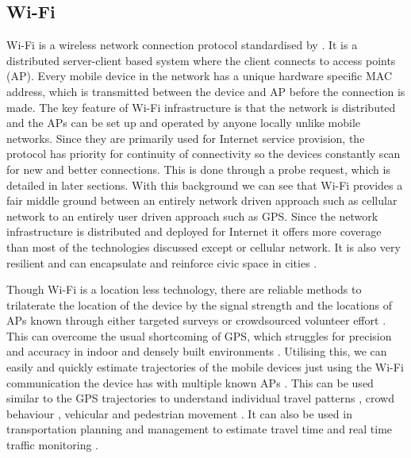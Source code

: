 \subsection{Wi-Fi}

Wi-Fi is a wireless network connection protocol standardised by \citet{ieee2016}.
It is a distributed server-client based system where the client connects to access points (AP).
Every mobile device in the network has a unique hardware specific MAC address, which is transmitted between the device and AP before the connection is made.
The key feature of Wi-Fi infrastructure is that the network is distributed and the APs can be set up and operated by anyone locally unlike mobile networks.
Since they are primarily used for Internet service provision, the protocol has priority for continuity of connectivity so the devices constantly scan for new and better connections.
This is done through a probe request, which is detailed in later sections.
With this background we can see that Wi-Fi provides a fair middle ground between an entirely network driven approach such as cellular network to an entirely user driven approach such as GPS.
Since the network infrastructure is distributed and deployed for Internet it offers more coverage than most of the technologies discussed except or cellular network. It is also very resilient and can encapsulate and reinforce civic space in cities \cite[-2cm]{torrens2008}.

Though Wi-Fi is a location less technology, there are reliable methods to trilaterate the location of the device by the signal strength and the locations of APs known through either targeted surveys or crowdsourced volunteer effort \citep{he2003, moore2004, lamarca2005, dinesh2017, lin2018}.
This can overcome the usual shortcoming of GPS, which struggles for precision and accuracy in indoor and densely built environments \citep{zarim2006, kawaguchi2009, xi2010}.
Utilising this, we can easily and quickly estimate trajectories of the mobile devices just using the Wi-Fi communication the device has with multiple known APs \cite[-4cm]{xu2013}.
This can be used similar to the GPS trajectories to understand individual travel patterns \citep{kim2006, rekimoto2007, sap2015}, crowd behaviour \citep{abedi2013, mowafi2013, shu2017}, vehicular \citep{lu2010} and pedestrian movement \citep{xu2013, fukuzaki2014, wang2016, taylor2019}.
It can also be used in transportation planning and management to estimate travel time \citep{musa2011, haakegaard2018} and real time traffic monitoring \citep{abbott-jard2013}.

